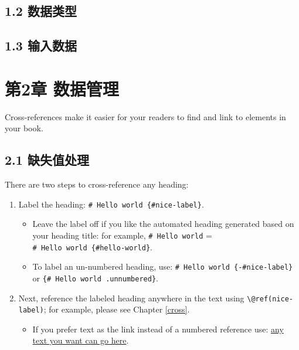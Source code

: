 \documentclass[
]{book}
\providecommand{\tightlist}{%
  \setlength{\itemsep}{0pt}\setlength{\parskip}{0pt}}
\theoremstyle{definition}
\theoremstyle{definition}
\theoremstyle{definition}
\theoremstyle{definition}
\theoremstyle{remark}
\begin{document}
\hypertarget{ux6570ux636eux7c7bux578b}{%
\section*{1.2 数据类型}\label{ux6570ux636eux7c7bux578b}}

\hypertarget{ux8f93ux5165ux6570ux636e}{%
\section*{1.3 输入数据}\label{ux8f93ux5165ux6570ux636e}}

\hypertarget{ux7b2c2ux7ae0-ux6570ux636eux7ba1ux7406}{%
\chapter*{第2章 数据管理}\label{ux7b2c2ux7ae0-ux6570ux636eux7ba1ux7406}}

Cross-references make it easier for your readers to find and link to elements in your book.

\hypertarget{ux7f3aux5931ux503cux5904ux7406}{%
\section*{2.1 缺失值处理}\label{ux7f3aux5931ux503cux5904ux7406}}

There are two steps to cross-reference any heading:

\begin{enumerate}
\def\labelenumi{\arabic{enumi}.}
\tightlist
\item
  Label the heading: \texttt{\#\ Hello\ world\ \{\#nice-label\}}.

  \begin{itemize}
  \tightlist
  \item
    Leave the label off if you like the automated heading generated based on your heading title: for example, \texttt{\#\ Hello\ world} = \texttt{\#\ Hello\ world\ \{\#hello-world\}}.
  \item
    To label an un-numbered heading, use: \texttt{\#\ Hello\ world\ \{-\#nice-label\}} or \texttt{\{\#\ Hello\ world\ .unnumbered\}}.
  \end{itemize}
\item
  Next, reference the labeled heading anywhere in the text using \texttt{\textbackslash{}@ref(nice-label)}; for example, please see Chapter \ref{cross}.

  \begin{itemize}
  \tightlist
  \item
    If you prefer text as the link instead of a numbered reference use: \protect\hyperlink{cross}{any text you want can go here}.
  \end{itemize}
\end{enumerate}
\end{document}
